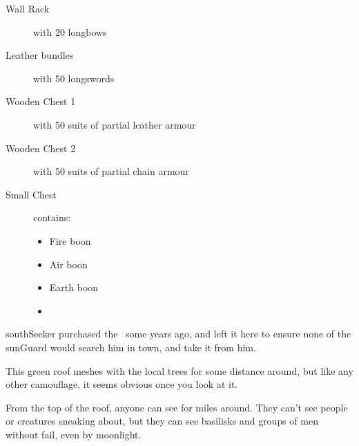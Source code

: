 \begin{description}
  \item[Wall Rack]
  with
  20 longbows
  \item[Leather bundles]
  with
  50 longswords
  \item[Wooden Chest 1]
  with
  50 suits of partial leather armour
  \item[Wooden Chest 2]
  with
  50 suits of partial chain armour
  \item[Small Chest]
  contains:
  \begin{itemize}
    \item
    Fire \gls{boon}
    \item
    Air \gls{boon}
    \item
    Earth \gls{boon}
    \item
    \lootMagic
  \end{itemize}
\end{description}

\addtocounter{treasure}{-1}
\Gls{southSeeker} purchased the \lootMagic\ some years ago, and left it here to ensure none of the \gls{sunGuard} would search him in \gls{town}, and take it from him.

\showTalisman


This green roof meshes with the local trees for some distance around, but like any other camouflage, it seems obvious once you look at it.

From the top of the roof, anyone can see for miles around.
They can't see people or creatures sneaking about, but they can see basilisks and groups of men without fail, even by moonlight.


